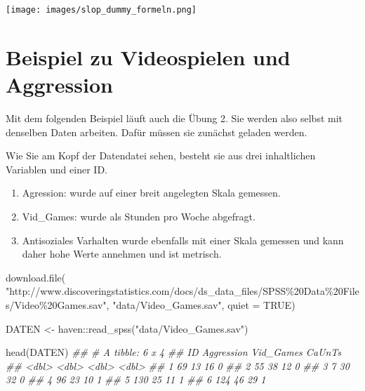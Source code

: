 \documentclass[
  10pt,
  letterpaper,
  a4paper, twoside]{scrreprt}
\newenvironment{Shaded}{\begin{snugshade}}{\end{snugshade}}
\newcommand{\AttributeTok}[1]{\textcolor[rgb]{0.40,0.45,0.13}{#1}}
\newcommand{\ConstantTok}[1]{\textcolor[rgb]{0.56,0.35,0.01}{#1}}
\newcommand{\DocumentationTok}[1]{\textcolor[rgb]{0.37,0.37,0.37}{\textit{#1}}}
\newcommand{\FunctionTok}[1]{\textcolor[rgb]{0.28,0.35,0.67}{#1}}
\newcommand{\NormalTok}[1]{\textcolor[rgb]{0.00,0.23,0.31}{#1}}
\newcommand{\OtherTok}[1]{\textcolor[rgb]{0.00,0.23,0.31}{#1}}
\newcommand{\SpecialCharTok}[1]{\textcolor[rgb]{0.37,0.37,0.37}{#1}}
\newcommand{\StringTok}[1]{\textcolor[rgb]{0.13,0.47,0.30}{#1}}
\providecommand{\tightlist}{%
  \setlength{\itemsep}{0pt}\setlength{\parskip}{0pt}}\usepackage{longtable,booktabs,array}
\begin{document}
\texttt{[image: images/slop\_dummy\_formeln.png]}

\section{Beispiel zu Videospielen und
Aggression}\label{beispiel-zu-videospielen-und-aggression}

Mit dem folgenden Beispiel läuft auch die Übung 2. Sie werden also
selbst mit denselben Daten arbeiten. Dafür müssen sie zunächst geladen
werden.

Wie Sie am Kopf der Datendatei sehen, besteht sie aus drei inhaltlichen
Variablen und einer ID.

\begin{enumerate}
\def\labelenumi{\arabic{enumi}.}
\tightlist
\item
  Agression: wurde auf einer breit angelegten Skala gemessen.
\item
  Vid\_Games: wurde als Stunden pro Woche abgefragt.
\item
  Antisoziales Varhalten wurde ebenfalls mit einer Skala gemessen und
  kann daher hohe Werte annehmen und ist metrisch.
\end{enumerate}

\begin{Shaded}
\begin{Highlighting}[]
\FunctionTok{download.file}\NormalTok{(}
  \StringTok{"http://www.discoveringstatistics.com/docs/ds\_data\_files/SPSS\%20Data\%20Files/Video\%20Games.sav"}\NormalTok{, }
  \StringTok{"data/Video\_Games.sav"}\NormalTok{, }\AttributeTok{quiet =} \ConstantTok{TRUE}\NormalTok{)}

\NormalTok{DATEN }\OtherTok{\textless{}{-}}\NormalTok{ haven}\SpecialCharTok{::}\FunctionTok{read\_spss}\NormalTok{(}\StringTok{"data/Video\_Games.sav"}\NormalTok{)}

\FunctionTok{head}\NormalTok{(DATEN)}
\DocumentationTok{\#\# \# A tibble: 6 x 4}
\DocumentationTok{\#\#      ID Aggression Vid\_Games CaUnTs}
\DocumentationTok{\#\#   \textless{}dbl\textgreater{}      \textless{}dbl\textgreater{}     \textless{}dbl\textgreater{}  \textless{}dbl\textgreater{}}
\DocumentationTok{\#\# 1    69         13        16      0}
\DocumentationTok{\#\# 2    55         38        12      0}
\DocumentationTok{\#\# 3     7         30        32      0}
\DocumentationTok{\#\# 4    96         23        10      1}
\DocumentationTok{\#\# 5   130         25        11      1}
\DocumentationTok{\#\# 6   124         46        29      1}
\end{Highlighting}
\end{Shaded}
\end{document}
